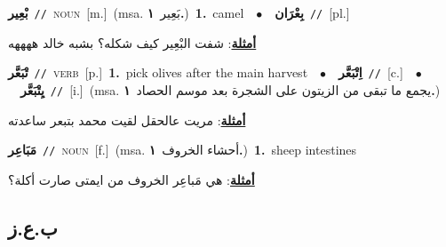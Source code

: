 \documentclass[10pt,a4paper,twoside]{article} %
\begin{document}
\begin{multicols}{2}
{\setlength\topsep{0pt}\textbf{\foreignlanguage{arabic}{بْعِير}}\ {\color{gray}\texttt{//}\color{black}}\ \textsc{noun}\ [m.]\ \color{gray}(msa. \foreignlanguage{arabic}{بَعِير}~\foreignlanguage{arabic}{\textbf{١.}})\color{black}\ \textbf{1.}~camel\ \ $\bullet$\ \ \setlength\topsep{0pt}\textbf{\foreignlanguage{arabic}{بِعْرَان}}\ {\color{gray}\texttt{//}\color{black}}\ [pl.]\  \begin{flushright}\color{gray}\foreignlanguage{arabic}{\textbf{\underline{\foreignlanguage{arabic}{أمثلة}}}: شفت البْعِير كيف شكله؟ بشبه خالد ههههه}\end{flushright}\color{black}} \vspace{2mm}

{\setlength\topsep{0pt}\textbf{\foreignlanguage{arabic}{تْبَعَّر}}\ {\color{gray}\texttt{//}\color{black}}\ \textsc{verb}\ [p.]\ \textbf{1.}~pick olives after the main harvest\ \ $\bullet$\ \ \setlength\topsep{0pt}\textbf{\foreignlanguage{arabic}{اِتْبَعَّر}}\ {\color{gray}\texttt{//}\color{black}}\ [c.]\ \ $\bullet$\ \ \setlength\topsep{0pt}\textbf{\foreignlanguage{arabic}{يِتْبَعَّر}}\ {\color{gray}\texttt{//}\color{black}}\ [i.]\ \color{gray}(msa. \foreignlanguage{arabic}{يجمع ما تبقى من الزيتون على الشجرة بعد موسم الحصاد}~\foreignlanguage{arabic}{\textbf{١.}})\color{black}\  \begin{flushright}\color{gray}\foreignlanguage{arabic}{\textbf{\underline{\foreignlanguage{arabic}{أمثلة}}}: مريت عالحقل لقيت محمد بتبعر ساعدته}\end{flushright}\color{black}} \vspace{2mm}

{\setlength\topsep{0pt}\textbf{\foreignlanguage{arabic}{مَبَاعِر}}\ {\color{gray}\texttt{//}\color{black}}\ \textsc{noun}\ [f.]\ \color{gray}(msa. \foreignlanguage{arabic}{أحشاء الخروف}~\foreignlanguage{arabic}{\textbf{١.}})\color{black}\ \textbf{1.}~sheep intestines\  \begin{flushright}\color{gray}\foreignlanguage{arabic}{\textbf{\underline{\foreignlanguage{arabic}{أمثلة}}}: هي مَباعِر الخروف من ايمتى صارت أكلة؟}\end{flushright}\color{black}} \vspace{2mm}

\vspace{-3mm}
\subsection*{\color{blue}\foreignlanguage{arabic}{ب.ع.ز}\color{blue}{}} 


\end{multicols}
\end{document}
